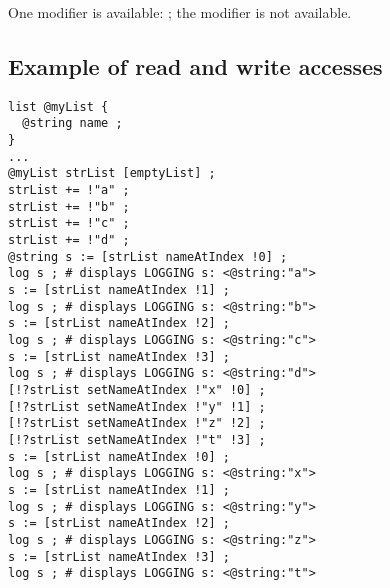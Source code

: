 One modifier is available: ; the  modifier is not available.

\subsection{Example of read and write accesses}

\begin{lstlisting}[language=galgas]
list @myList {
  @string name ;
}
...
@myList strList [emptyList] ;
strList += !"a" ;
strList += !"b" ;
strList += !"c" ;
strList += !"d" ;
@string s := [strList nameAtIndex !0] ;
log s ; # displays LOGGING s: <@string:"a">
s := [strList nameAtIndex !1] ;
log s ; # displays LOGGING s: <@string:"b">
s := [strList nameAtIndex !2] ;
log s ; # displays LOGGING s: <@string:"c">
s := [strList nameAtIndex !3] ;
log s ; # displays LOGGING s: <@string:"d">
[!?strList setNameAtIndex !"x" !0] ;
[!?strList setNameAtIndex !"y" !1] ;
[!?strList setNameAtIndex !"z" !2] ;
[!?strList setNameAtIndex !"t" !3] ;
s := [strList nameAtIndex !0] ;
log s ; # displays LOGGING s: <@string:"x">
s := [strList nameAtIndex !1] ;
log s ; # displays LOGGING s: <@string:"y">
s := [strList nameAtIndex !2] ;
log s ; # displays LOGGING s: <@string:"z">
s := [strList nameAtIndex !3] ;
log s ; # displays LOGGING s: <@string:"t">
\end{lstlisting}
